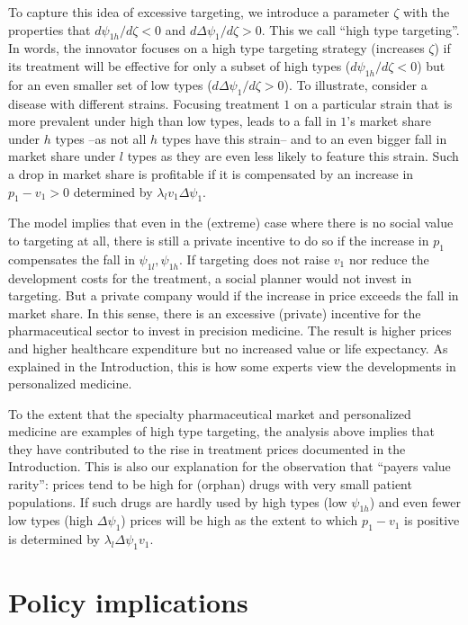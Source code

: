 \documentclass[a4paper,12pt]{article}
\begin{document}
To capture this idea of excessive targeting, we introduce a parameter \(\zeta\) with the properties that \(d\psi_{1h}/d\zeta <0\) and \(d\Delta \psi_1/d\zeta>0\). This we call ``high type targeting''. In words, the innovator focuses on a high type targeting strategy (increases \(\zeta\)) if its treatment will be effective for only a subset of high types (\(d\psi_{1h}/d\zeta <0\)) but for an even smaller set of low types (\(d\Delta\psi_1/d\zeta>0\)). To illustrate, consider a disease with different strains. Focusing treatment \(1\) on a particular strain that is more prevalent under high than low types, leads to a fall in \(1\)'s market share under \(h\) types --as not all \(h\) types have this strain-- and to an even bigger fall in market share under \(l\) types as they are even less likely to feature this strain. Such a drop in market share is profitable if it is compensated by an increase in \(p_1-v_1>0\) determined by \(\lambda_l v_1 \Delta \psi_1\).

The model implies that even in the (extreme) case where there is no social value to targeting at all, there is still a private incentive to do so if the increase in \(p_1\) compensates the fall in \(\psi_{1l},\psi_{1h}\). If targeting does not raise \(v_1\) nor reduce the development costs for the treatment, a social planner would not invest in targeting. But a private company would if the increase in price exceeds the fall in market share. In this sense, there is an excessive (private) incentive for the pharmaceutical sector to invest in precision medicine. The result is higher prices and higher healthcare expenditure but no increased value or life expectancy. As explained in the Introduction, this is how some experts view the developments in personalized medicine.

To the extent that the specialty pharmaceutical market and  personalized medicine are examples of high type targeting, the analysis above implies that they have contributed to the rise in treatment prices documented in the Introduction. This is also our explanation for the observation that ``payers value rarity'': prices tend to be high for (orphan) drugs with very small patient populations. If such drugs are hardly used by high types (low \(\psi_{1h}\)) and even fewer low types (high \(\Delta \psi_1\)) prices will be high as the extent to which \(p_1-v_1\) is positive is determined by \(\lambda_l \Delta \psi_1 v_1\).


\section{Policy implications}
\label{sec:orgc646be4}
\end{document}
